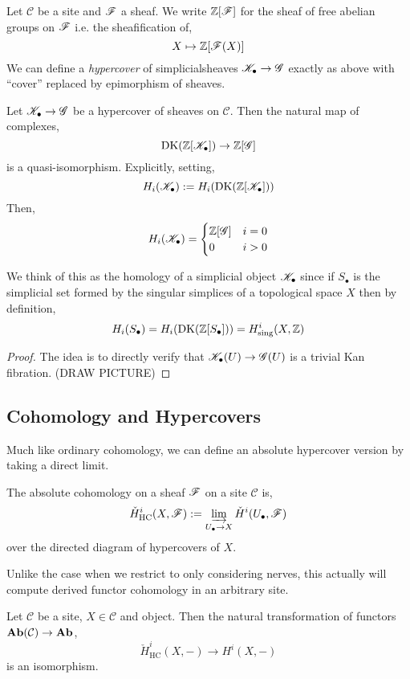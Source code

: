 \documentclass[12pt]{article}
\newcommand{\sing}{\text{sing}}
\renewcommand{\C}{\mathcal{C}}
\newcommand{\DK}{\mathrm{DK}}
\renewcommand{\Cech}{\text{\v{C}ech}\xspace}
\begin{document}
Let $\C$ be a site and $\mathscr{F}$ a sheaf. We write $\mathbb{Z}[\mathscr{F}]$ for the sheaf of free abelian groups on $\mathscr{F}$ i.e. the sheafification of,
\[ X \mapsto \mathbb{Z}[\mathscr{F}(X)] \]
We can define a \textit{hypercover} of simplicialsheaves $\mathscr{K}_\bullet \to \mathscr{G}$ exactly as above with ``cover'' replaced by epimorphism of sheaves. 

\begin{lemma}
Let $\mathscr{K}_\bullet \to \mathscr{G}$ be a hypercover of sheaves on $\C$. Then the natural map of complexes,
\[ \DK(\Z[\K_\bullet]) \to \Z[\G] \]
is a quasi-isomorphism. Explicitly, setting,
\[ H_i(\K_\bullet) := H_i(\DK(\Z[\K_\bullet])) \]
Then,
\[ H_i(\mathscr{K}_\bullet) = 
\begin{cases}
\mathbb{Z}[\mathscr{G}] & i = 0
\\
0 & i > 0
\end{cases} \]
\end{lemma}

\begin{rmk}
We think of this as the homology of a simplicial object $\mathscr{K}_\bullet$ since if $S_\bullet$ is the simplicial set formed by the singular simplices of a topological space $X$ then by definition,
\[ H_i(S_\bullet) = H_i(\DK(\Z[S_\bullet])) = H_{\sing}^i(X, \Z) \]
\end{rmk}

\begin{proof}
The idea is to directly verify that $\mathscr{K}_\bullet(U) \to \mathscr{G}(U)$ is a trivial Kan fibration. (DRAW PICTURE)
\end{proof}

\subsection{Cohomology and Hypercovers}

Much like ordinary \Cech cohomology, we can define an absolute hypercover version by taking a direct limit.

\begin{defn}
The absolute \Cech cohomology on a sheaf $\mathscr{F}$ on a site $\C$ is,
\[ \check{H}^i_{\text{HC}}(X, \mathscr{F}) := \operatorname*{\varinjlim}_{U_\bullet \to X} \check{H}^i(U_\bullet, \mathscr{F}) \]
over the directed diagram of hypercovers of $X$.
\end{defn}

Unlike the case when we restrict to only considering \Cech nerves, this actually will compute derived functor cohomology in an arbitrary site.

\begin{thm}
Let $\C$ be a site, $X \in \C$ and object. Then the natural transformation of functors $\Ab(\C) \to \Ab$,
\[ \check{H}^i_{\text{HC}}(X, -) \to H^i(X, -) \]
is an isomorphism.
\end{thm}
\end{document}
